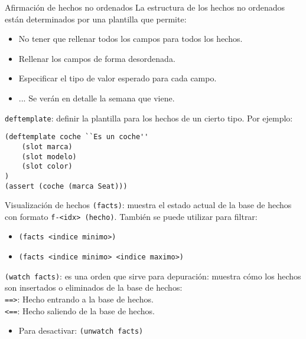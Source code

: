 \documentclass[usenames,dvipsnames,aspectratio=169]{beamer}
\begin{document}
\begin{frame}[fragile]{Afirmación de hechos no ordenados}
	La estructura de los hechos no ordenados están determinados por una plantilla que permite:
	\begin{itemize}
		\item No tener que rellenar todos los campos para todos los hechos.
		\item Rellenar los campos de forma desordenada.
		\item Especificar el tipo de valor esperado para cada campo.
		\item ... Se verán en detalle la semana que viene. 
	\end{itemize}
	\texttt{deftemplate}: definir la plantilla para los hechos de un cierto tipo. Por ejemplo:
\begin{verbatim}
(deftemplate coche ``Es un coche''
    (slot marca)
    (slot modelo)
    (slot color)
)
(assert (coche (marca Seat)))
\end{verbatim}
\end{frame}

\begin{frame}{Visualización de hechos}
	\texttt{(facts)}: muestra el estado actual de la base de hechos con formato \texttt{f-<idx> (hecho)}. También se puede utilizar para filtrar:
	\begin{itemize}
		\item \texttt{(facts <indice minimo>)}
		\item \texttt{(facts <indice minimo> <indice maximo>)}
	\end{itemize}
	\texttt{(watch facts)}: es una orden que sirve para depuración: muestra cómo los hechos son insertados o eliminados de la base de hechos:\\
	\texttt{==>}: Hecho entrando a la base de hechos.\\
	\texttt{<==}: Hecho saliendo de la base de hechos.
	\begin{itemize}
		\item Para desactivar: \texttt{(unwatch facts)}
	\end{itemize}
\end{frame}
\end{document}
